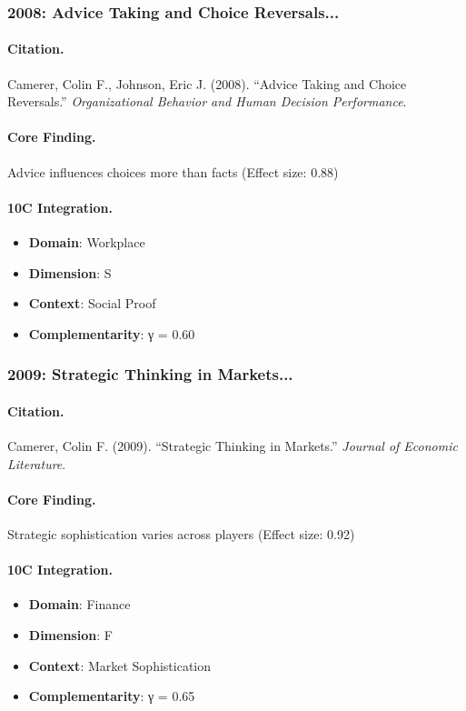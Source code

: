 \subsubsection{2008: Advice Taking and Choice Reversals...}

\paragraph{Citation.}
Camerer, Colin F., Johnson, Eric J. (2008). ``Advice Taking and Choice Reversals.''
\textit{Organizational Behavior and Human Decision Performance}.

\paragraph{Core Finding.}
Advice influences choices more than facts (Effect size: 0.88)

\paragraph{10C Integration.}
\begin{itemize}[nosep]
  \item \textbf{Domain}: Workplace
  \item \textbf{Dimension}: S
  \item \textbf{Context}: Social Proof
  \item \textbf{Complementarity}: γ = 0.60
\end{itemize}

\subsubsection{2009: Strategic Thinking in Markets...}

\paragraph{Citation.}
Camerer, Colin F. (2009). ``Strategic Thinking in Markets.''
\textit{Journal of Economic Literature}.

\paragraph{Core Finding.}
Strategic sophistication varies across players (Effect size: 0.92)

\paragraph{10C Integration.}
\begin{itemize}[nosep]
  \item \textbf{Domain}: Finance
  \item \textbf{Dimension}: F
  \item \textbf{Context}: Market Sophistication
  \item \textbf{Complementarity}: γ = 0.65
\end{itemize}

